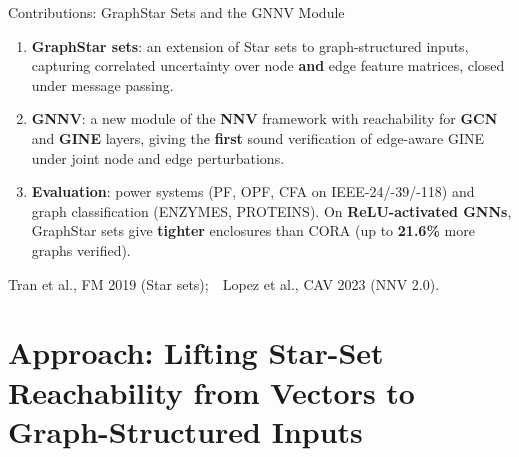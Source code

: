 \documentclass[11pt,aspectratio=169,t]{beamer}
\newcommand{\good}[1]{\textbf{\textcolor{safegreen}{#1}}}
\newcommand{\key}[1]{\textbf{\textcolor{VUgoldDark}{#1}}}
\newcommand{\refline}[1]{\par\vfill\nointerlineskip
  {\centering\tiny\color{VUgrey!75} #1\par}\vspace{0.2ex}}
\begin{document}
\begin{frame}{Contributions: GraphStar Sets and the GNNV Module}
  \begin{enumerate}\itemsep=0.9ex
    \item \key{GraphStar sets}: an extension of Star sets to graph-structured
          inputs, capturing correlated uncertainty over node \textbf{and} edge
          feature matrices, closed under message passing.
    \item \key{GNNV}: a new module of the \textbf{NNV} framework with
          reachability for \textbf{GCN} and \textbf{GINE} layers, giving the
          \key{first} sound verification of edge-aware GINE under joint node
          and edge perturbations.
    \item \key{Evaluation}: power systems (PF, OPF, CFA on IEEE-24/-39/-118)
          and graph classification (ENZYMES, PROTEINS). On \textbf{ReLU-activated
          GNNs}, GraphStar sets give \good{tighter} enclosures than CORA (up to
          \good{21.6\%} more graphs verified).
  \end{enumerate}
  \vfill
  \refline{Tran et al., FM 2019 (Star sets);\ \ Lopez et al., CAV 2023 (NNV 2.0).}
\end{frame}

\section{Approach: Lifting Star-Set Reachability from Vectors to Graph-Structured Inputs}
\end{document}

